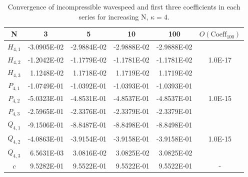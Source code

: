 \begin{table}[htbp]
	\centering
		\begin{tabular}{|c|r|r|r|r|c|} \hline
		N&\multicolumn{1}{|c|}{3}&\multicolumn{1}{|c|}{5}&\multicolumn{1}{|c|}{10}&
		\multicolumn{1}{|c|}{100}&$O(\text{Coeff}_{100})$ \\
		\hline
		$H_{4,1}$ &-3.0905E-02 & -2.9884E-02&-2.9888E-02& -2.9888E-02&\\
		$H_{4,2}$ &-1.2042E-02&-1.1779E-02&-1.1781E-02&-1.1781E-02&1.0E-17 \\
		$H_{4,3}$ &1.1248E-02&1.1718E-02&1.1719E-02&1.1719E-02& \\ \hline
		$P_{4,1}$ &-1.0749E-01&-1.0392E-01&-1.0393E-01&-1.0393E-01& \\
		$P_{4,2}$ &-5.0323E-01&-4.8531E-01&-4.8537E-01&-4.8537E-01&1.0E-15\\
		$P_{4,3}$ &-2.5965E-01&-2.3376E-01&-2.3379E-01&-2.3379E-01& \\ \hline
		$Q_{4,1}$ &-9.1506E-01&-8.8487E-01&-8.8498E-01&-8.8498E-01& \\
		$Q_{4,2}$ &-4.0863E-01&-3.9154E-01&-3.9158E-01&-3.9158E-01&1.0E-15\\
		$Q_{4,3}$ &6.5631E-03&3.0816E-02&3.0825E-02&3.0825E-02& \\ \hline
		$c$ &9.5282E-01&9.5522E-01&9.5522E-01&9.5522E-01&- \\
		\hline			
		\end{tabular}
	\caption{Convergence of incompressible wavespeed and first three coefficients in each series for increasing N, $\kappa=4$.}
	\label{tab:incompconverg4}
\end{table}
